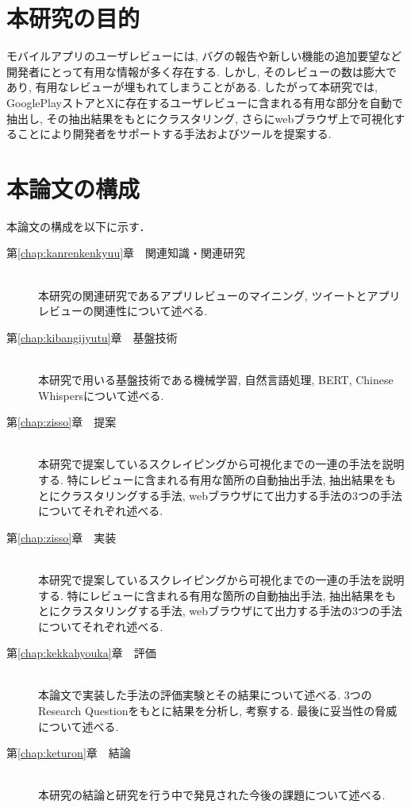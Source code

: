 
\section{本研究の目的}

モバイルアプリのユーザレビューには, バグの報告や新しい機能の追加要望など開発者にとって有用な情報が多く存在する. しかし, そのレビューの数は膨大であり, 有用なレビューが埋もれてしまうことがある. 
したがって本研究では, GooglePlayストアとXに存在するユーザレビューに含まれる有用な部分を自動で抽出し, その抽出結果をもとにクラスタリング, さらにwebブラウザ上で可視化することにより開発者をサポートする手法およびツールを提案する. 


\section{本論文の構成}
本論文の構成を以下に示す．
\begin{description}

\item[第\ref{chap:kanrenkenkyuu}章　関連知識・関連研究]\mbox{}\\
本研究の関連研究であるアプリレビューのマイニング, ツイートとアプリレビューの関連性について述べる. \\

\item[第\ref{chap:kibangijyutu}章　基盤技術]\mbox{}\\
本研究で用いる基盤技術である機械学習, 自然言語処理, BERT, Chinese Whispersについて述べる. \\

\item[第\ref{chap:zisso}章　提案]\mbox{}\\
本研究で提案しているスクレイピングから可視化までの一連の手法を説明する. 特にレビューに含まれる有用な箇所の自動抽出手法, 抽出結果をもとにクラスタリングする手法, webブラウザにて出力する手法の3つの手法についてそれぞれ述べる. \\

\item[第\ref{chap:zisso}章　実装]\mbox{}\\
本研究で提案しているスクレイピングから可視化までの一連の手法を説明する. 特にレビューに含まれる有用な箇所の自動抽出手法, 抽出結果をもとにクラスタリングする手法, webブラウザにて出力する手法の3つの手法についてそれぞれ述べる. \\

\item[第\ref{chap:kekkahyouka}章　評価]\mbox{}\\
本論文で実装した手法の評価実験とその結果について述べる. 3つのResearch Questionをもとに結果を分析し, 考察する. 最後に妥当性の脅威について述べる. \\

\item[第\ref{chap:keturon}章　結論]\mbox{}\\
本研究の結論と研究を行う中で発見された今後の課題について述べる. \\

\end{description}